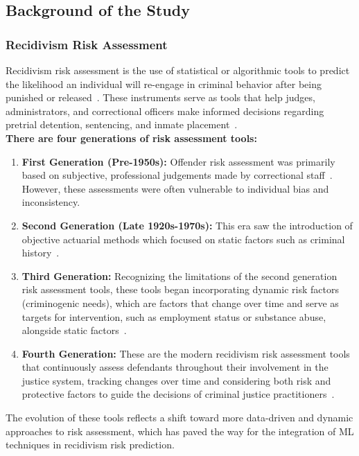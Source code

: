 \documentclass[12pt]{article}
\begin{document}
\subsection{Background of the Study}
\subsubsection{Recidivism Risk Assessment} 
\tab Recidivism risk assessment is the use of statistical or algorithmic tools to predict the likelihood an individual will re-engage in criminal behavior after being punished or released~\cite{ozkan2017predicting}. These instruments serve as tools that help judges, administrators, and correctional officers make informed decisions regarding pretrial detention, sentencing, and inmate placement~\cite{corbett2017algorithmic}.\\

\textbf{There are four generations of risk assessment tools:}
\begin{enumerate}
 \item \textbf{First Generation (Pre-1950s):} Offender risk assessment was primarily based on subjective, professional judgements made by correctional staff~\cite{duwe2017out,ozkan2017predicting}. However, these assessments were often vulnerable to individual bias and inconsistency.
 \item \textbf{Second Generation (Late 1920s-1970s):} This era saw the introduction of objective actuarial methods which focused on static factors such as criminal history~\cite{duwe2017out}. 
 \item \textbf{Third Generation:} Recognizing the limitations of the second generation risk assessment tools, these tools began incorporating dynamic risk factors (criminogenic needs), which are factors that change over time and serve as targets for intervention, such as employment status or substance abuse, alongside static factors~\cite{duwe2017out}. 
 \item \textbf{Fourth Generation:} These are the modern recidivism risk assessment tools that continuously assess defendants throughout their involvement in the justice system, tracking changes over time and considering both risk and protective factors to guide the decisions of criminal justice practitioners~\cite{duwe2017out}.
\end{enumerate}

The evolution of these tools reflects a shift toward more data-driven and dynamic approaches to risk assessment, which has paved the way for the integration of ML techniques in recidivism risk prediction.
\end{document}
